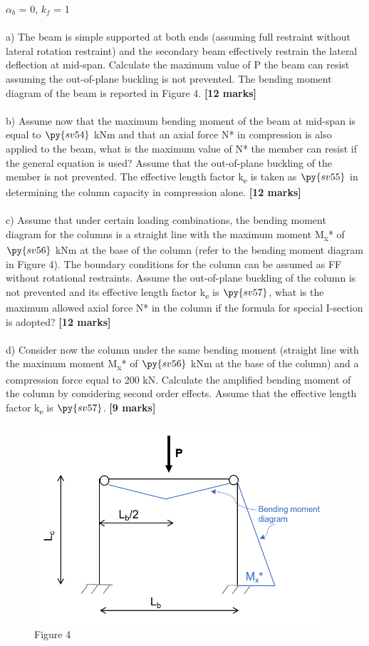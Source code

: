 \documentclass[a4paper,11pt]{article}
\begin{document}
$\alpha_b$ = 0, $k_f$ = 1\\
\\
a) The beam is simple supported at both ends (assuming full restraint without lateral rotation restraint) and the secondary beam effectively restrain the lateral deflection at mid-span. Calculate the maximum value of P the beam can resist assuming the out-of-plane buckling is not prevented. The bending moment diagram of the beam is reported in Figure 4. \textbf{[12 marks]}\\
\\
b) Assume now that the maximum bending moment of the beam at mid-span is equal to $\py{sv54}$ kNm and that an axial force N* in compression is also applied to the beam, what is the maximum value of N* the member can resist if the general equation is used? Assume that the out-of-plane buckling of the member is not prevented. The effective length factor k\textsubscript{e} is taken as $\py{sv55}$ in determining the column capacity in compression alone. \textbf{[12 marks]}\\
\\
c) Assume that under certain loading combinations, the bending moment diagram for the columns is a straight line with the maximum moment M\textsubscript{x}* of $\py{sv56}$ kNm at the base of the column (refer to the bending moment diagram in Figure 4). The boundary conditions for the column can be assumed as FF without rotational restraints. Assume the out-of-plane buckling of the column is not prevented and its effective length factor k\textsubscript{e} is $\py{sv57}$, what is the maximum allowed axial force N* in the column if the formula for special I-section is adopted?  \textbf{[12 marks]}\\
\\
d) Consider now the column under the same bending moment (straight line with the maximum moment M\textsubscript{x}* of $\py{sv56}$ kNm at the base of the column) and a compression force equal to 200 kN. Calculate the amplified bending moment of the column by considering second order effects. Assume that the effective length factor k\textsubscript{e} is $\py{sv57}$. \textbf{[9 marks]}\\
\begin{figure}[ht]
\includegraphics[width=10.64cm, height=7.33cm]{Figure4.png}\\
\centering
Figure 4\\
\centering
\end{figure}
\end{document}
